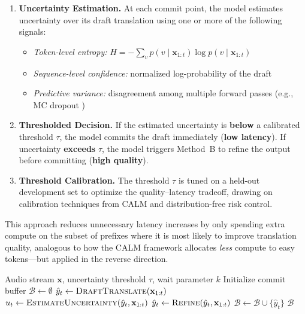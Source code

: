 \begin{enumerate}[leftmargin=*, itemsep=4pt]
    \item \textbf{Uncertainty Estimation.} At each commit point, the model estimates uncertainty over its draft translation using one or more of the following signals:
    \begin{itemize}[itemsep=2pt]
        \item \textit{Token-level entropy:} $H = -\sum_{v} p(v \mid \mathbf{x}_{1:t}) \log p(v \mid \mathbf{x}_{1:t})$
        \item \textit{Sequence-level confidence:} normalized log-probability of the draft
        \item \textit{Predictive variance:} disagreement among multiple forward passes (e.g., MC dropout \citep{fomicheva2020unsupervised})
    \end{itemize}

    \item \textbf{Thresholded Decision.} If the estimated uncertainty is \textbf{below} a calibrated threshold $\tau$, the model commits the draft immediately (\textbf{low latency}). If uncertainty \textbf{exceeds} $\tau$, the model triggers Method~B to refine the output before committing (\textbf{high quality}).

    \item \textbf{Threshold Calibration.} The threshold $\tau$ is tuned on a held-out development set to optimize the quality--latency tradeoff, drawing on calibration techniques from CALM \citep{schuster2022calm} and distribution-free risk control.
\end{enumerate}

This approach reduces unnecessary latency increases by only spending extra compute on the subset of prefixes where it is most likely to improve translation quality, analogous to how the CALM framework \citep{schuster2022calm} allocates \emph{less} compute to easy tokens---but applied in the reverse direction.

\begin{algorithm}[ht]
\caption{Uncertainty-Triggered Selective Refinement}
\label{alg:selective}
\begin{algorithmic}[1]
\Require Audio stream $\mathbf{x}$, uncertainty threshold $\tau$, wait parameter $k$
\State Initialize commit buffer $\mathcal{B} \gets \emptyset$
    \State $\hat{y}_t \gets \textsc{DraftTranslate}(\mathbf{x}_{1:t})$
    \State $u_t \gets \textsc{EstimateUncertainty}(\hat{y}_t, \mathbf{x}_{1:t})$
     
        \State $\hat{y}_t \gets \textsc{Refine}(\hat{y}_t, \mathbf{x}_{1:t})$
    \EndIf
    \State $\mathcal{B} \gets \mathcal{B} \cup \{\hat{y}_t\}$ 
\EndFor
\State \Return $\mathcal{B}$
\end{algorithmic}
\end{algorithm}


